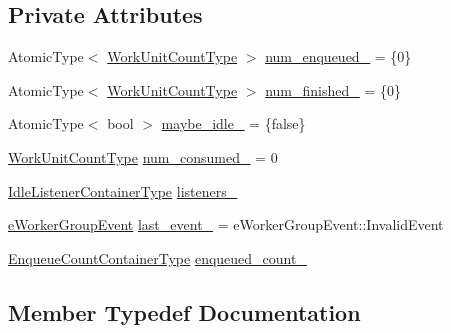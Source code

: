 \subsection*{Private Attributes}
\begin{DoxyCompactItemize}
\item 
Atomic\+Type$<$ \hyperlink{namespacevt_1_1worker_a8080c49350b0520151601a8b24d6c6cf}{Work\+Unit\+Count\+Type} $>$ \hyperlink{structvt_1_1worker_1_1_worker_group_counter_a9637b5ea108554b2243ad0de5f211940}{num\+\_\+enqueued\+\_\+} = \{0\}
\item 
Atomic\+Type$<$ \hyperlink{namespacevt_1_1worker_a8080c49350b0520151601a8b24d6c6cf}{Work\+Unit\+Count\+Type} $>$ \hyperlink{structvt_1_1worker_1_1_worker_group_counter_a725b7c60813d11208d5a1277bc0e7834}{num\+\_\+finished\+\_\+} = \{0\}
\item 
Atomic\+Type$<$ bool $>$ \hyperlink{structvt_1_1worker_1_1_worker_group_counter_ad8e2001326cc6034e5bb45b6b6572b32}{maybe\+\_\+idle\+\_\+} = \{false\}
\item 
\hyperlink{namespacevt_1_1worker_a8080c49350b0520151601a8b24d6c6cf}{Work\+Unit\+Count\+Type} \hyperlink{structvt_1_1worker_1_1_worker_group_counter_ae8c275b953a8e67c039cdb518fc8a705}{num\+\_\+consumed\+\_\+} = 0
\item 
\hyperlink{structvt_1_1worker_1_1_worker_group_counter_a27ecc5576966def3b786c8470e3fbf9d}{Idle\+Listener\+Container\+Type} \hyperlink{structvt_1_1worker_1_1_worker_group_counter_a4f9e39a318fde14321c23cd4f8048005}{listeners\+\_\+}
\item 
\hyperlink{namespacevt_1_1worker_abcb798436f1cdc4fab035def5b912d1f}{e\+Worker\+Group\+Event} \hyperlink{structvt_1_1worker_1_1_worker_group_counter_a0d841e228f4643df513490e67febffbc}{last\+\_\+event\+\_\+} = e\+Worker\+Group\+Event\+::\+Invalid\+Event
\item 
\hyperlink{structvt_1_1worker_1_1_worker_group_counter_ab0ceac7975b91fa9c08f8c416a4ea1cc}{Enqueue\+Count\+Container\+Type} \hyperlink{structvt_1_1worker_1_1_worker_group_counter_ab1eaca2789dc3ebfcb445374f2068b26}{enqueued\+\_\+count\+\_\+}
\end{DoxyCompactItemize}


\subsection{Member Typedef Documentation}
\mbox{\label{structvt_1_1worker_1_1_worker_group_counter_ab0ceac7975b91fa9c08f8c416a4ea1cc}} 

